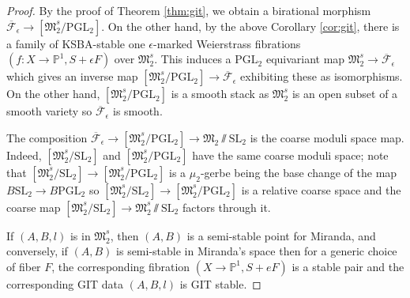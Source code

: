 \documentclass[11pt]{amsart}
\theoremstyle{definition}
\theoremstyle{remark}
\newcommand{\SL}{\mathrm{SL}}
\newcommand{\PGL}{\mathrm{PGL}}
\newcommand{\mb}[1]{\mathbb{#1}}
\newcommand{\fe}{\overline{\mathcal{F}}_\epsilon}
\newcommand{\km}{\fe}
\begin{document}
	\begin{proof} By the proof of Theorem \ref{thm:git}, we obtain a birational morphism $\km \to [\mathfrak{M}_2^s/\PGL_2]$. On the other hand, by the above Corollary \ref{cor:git}, there is a family of  KSBA-stable one $\epsilon$-marked Weierstrass fibrations $(f : X \to \mb{P}^1, S + \epsilon F)$ over $\mathfrak{M}_2^s$. This induces a $\PGL_2$ equivariant map $\mathfrak{M}_2^s \to \km$ which gives an inverse map $[\mathfrak{M}_2^s/\PGL_2] \to \km$ exhibiting these as isomorphisms. On the other hand, $[\mathfrak{M}_2^s/\PGL_2]$ is a smooth stack as $\mathfrak{M}_2^s$ is an open subset of a smooth variety so $\km$ is smooth.
		
		The composition $\km \to [\mathfrak{M}_2^s/\PGL_2] \to \mathfrak{M}_2 \sslash \SL_2$ is the coarse moduli space map. Indeed, $[\mathfrak{M}_2^s/\SL_2]$ and $[\mathfrak{M}_2^s/\PGL_2]$ have the same coarse moduli space; note that $[\mathfrak{M}_2^s/\SL_2] \to [\mathfrak{M}_2^s/\PGL_2]$ is a $\mu_2$-gerbe being the base change of the map $B\SL_2 \to B\PGL_2$ so $[\mathfrak{M}_2^s/\SL_2] \to [\mathfrak{M}_2^s/\PGL_2]$ is a relative coarse space and the coarse map $[\mathfrak{M}_2^s/\SL_2] \to \mathfrak{M}_2^s \sslash \SL_2$ factors through it. 
		
		If $(A,B,l)$ is in $\mathfrak{M}^s_2$, then $(A,B)$ is a semi-stable point for Miranda, and conversely, if $(A,B)$ is semi-stable in Miranda's space then for a generic choice of fiber $F$, the corresponding fibration $(X \to \mb{P}^1, S + eF)$ is a stable pair and the corresponding GIT data $(A,B,l)$ is GIT stable. \end{proof} 
	
	
	
	
	
	
	
	
	
\end{document}
